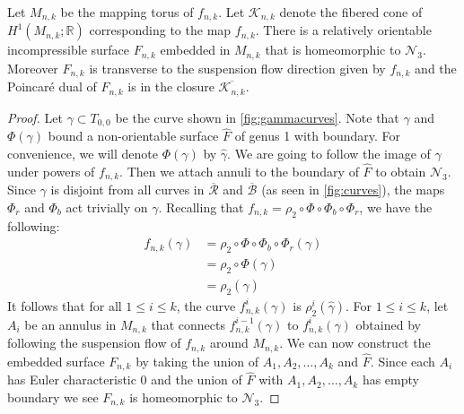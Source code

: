 \begin{prop}
\label{lem:genus3}
Let $M_{n,k}$ be the mapping torus of $f_{n,k}$. Let $\mathcal{K}_{n,k}$ denote the fibered cone of
$H^1(M_{n,k};\mathbb{R})$ corresponding to the map $f_{n,k}$. 
There is a relatively orientable incompressible surface $F_{n,k}$ embedded in $M_{n,k}$ that is homeomorphic to $\mathcal{N}_3$.
Moreover $F_{n,k}$ is transverse to the suspension flow direction given by $f_{n,k}$ and the Poincar\'e dual of $F_{n,k}$ is in
the closure $\overline{\mathcal{K}_{n,k}}$.
\end{prop}
\begin{proof}
  Let $\gamma \subset T_{0,0}$ be the curve shown in \autoref{fig:gammacurves}. Note that $\gamma$ and $\Phi(\gamma)$ bound a non-orientable surface
  $\widehat{F}$ of genus 1 with boundary. For convenience, we will denote $\Phi(\gamma)$ by $\widehat{\gamma}$. We are going to follow the image of $\gamma$
  under powers of $f_{n,k}$.  Then we attach annuli to the
  boundary of $\widehat{F}$ to obtain $\mathcal{N}_3$. Since $\gamma$ is disjoint from all curves in $\overline{\mathcal{R}}$ and $\overline{\mathcal{B}}$ (as seen in \autoref{fig:curves}), the maps $\Phi_r$ and $\Phi_b$ act trivially on $\gamma$.  Recalling that $f_{n,k}=\rho_2\circ\Phi\circ\Phi_b\circ\Phi_r$, we have the following:
  \begin{align*}
    f_{n,k}(\gamma) &= \rho_2 \circ \Phi \circ \Phi_b \circ \Phi_r(\gamma) \\
                    &= \rho_2 \circ \Phi(\gamma) \\
                    &= \rho_2(\widehat{\gamma}) %
  \end{align*}
  It follows that for all $1\leq i\leq k$, the curve $f_{n,k}^i(\gamma)$ is $\rho_2^i(\widehat{\gamma})$.  
  For $1\leq i\leq k$, let $A_i$ be an annulus in $M_{n,k}$ that connects $f_{n,k}^{i-1}(\gamma)$ to $f_{n,k}^i(\gamma)$ obtained by following the suspension
  flow of $f_{n,k}$ around $M_{n,k}$. We can now construct the embedded surface $F_{n,k}$ by taking the union of
  $A_1,A_2,\dots,A_k$ and $\widehat{F}$. Since each $A_i$ has Euler characteristic 0 and the union of $\widehat{F}$ with $A_1,A_2,\dots, A_k$ has empty boundary we see $F_{n,k}$ is homeomorphic to $\mathcal{N}_3$.


\end{proof}
